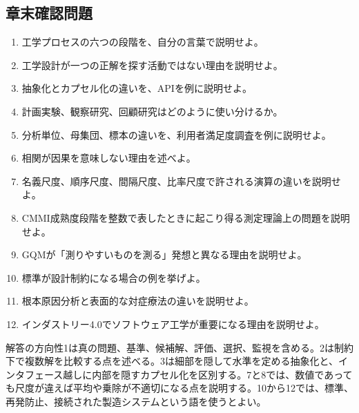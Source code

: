 \documentclass[a4paper,11pt]{ltjsarticle}
\numberwithin{figure}{section}
\numberwithin{table}{section}
\begin{document}
\subsection{章末確認問題}
\begin{enumerate}[leftmargin=2em]
\item 工学プロセスの六つの段階を、自分の言葉で説明せよ。
\item 工学設計が一つの正解を探す活動ではない理由を説明せよ。
\item 抽象化とカプセル化の違いを、APIを例に説明せよ。
\item 計画実験、観察研究、回顧研究はどのように使い分けるか。
\item 分析単位、母集団、標本の違いを、利用者満足度調査を例に説明せよ。
\item 相関が因果を意味しない理由を述べよ。
\item 名義尺度、順序尺度、間隔尺度、比率尺度で許される演算の違いを説明せよ。
\item CMMI成熟度段階を整数で表したときに起こり得る測定理論上の問題を説明せよ。
\item GQMが「測りやすいものを測る」発想と異なる理由を説明せよ。
\item 標準が設計制約になる場合の例を挙げよ。
\item 根本原因分析と表面的な対症療法の違いを説明せよ。
\item インダストリー4.0でソフトウェア工学が重要になる理由を説明せよ。
\end{enumerate}
\begin{notebox}{解答の方向性}1は真の問題、基準、候補解、評価、選択、監視を含める。2は制約下で複数解を比較する点を述べる。3は細部を隠して水準を定める抽象化と、インタフェース越しに内部を隠すカプセル化を区別する。7と8では、数値であっても尺度が違えば平均や乗除が不適切になる点を説明する。10から12では、標準、再発防止、接続された製造システムという語を使うとよい。\end{notebox}
\end{document}
